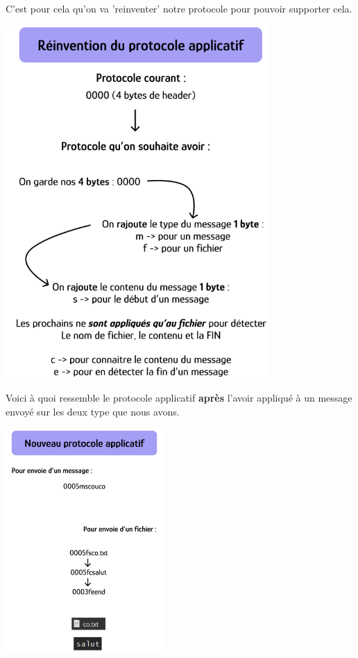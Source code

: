 C'est pour cela qu'on va 'reinventer' notre protocole pour pouvoir supporter cela. \\ \par

    {
    \centering
    \includegraphics[width=10cm]{figures/reinvention_protocole.png}
    \par
    } \hfill \par

Voici à quoi ressemble le protocole applicatif \textbf{après} l'avoir appliqué à un message envoyé sur les deux type que nous avons. 

    {
    \centering
    \includegraphics[width=6cm]{figures/new_protocole_applicatif.png}
    \par
    } \hfill \\ \par


